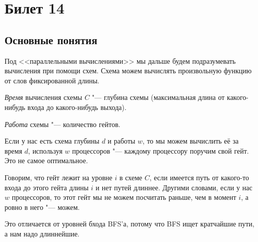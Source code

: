 \setcounter{section}{13}
\section{Билет 14}
\subsection{Основные понятия}
	Под <<параллельными вычислениями>> мы дальше будем подразумевать вычисления при помощи схем.
	Схема можем вычислять произвольную функцию от слов фиксированной длины.

	\begin{Def}
		\textit{Время} вычисления схемы $C$ "--- глубина схемы (максимальная длина от какого-нибудь входа до какого-нибудь выхода).
	\end{Def}
	\begin{Def}
		\textit{Работа} схемы "--- количество гейтов.
	\end{Def}
	\begin{Rem}
		Если у нас есть схема глубины $d$ и работы $w$, то мы можем вычислить её за время $d$, используя $w$ процессоров "--- каждому процессору поручим свой гейт.
		Это не самое оптимальное.
	\end{Rem}

	\begin{Def}
		Говорим, что гейт лежит на уровне $i$ в схеме $C$, если имеется путь от какого-то входа до этого гейта длины $i$ и нет путей длиннее.
		Другими словами, если у нас $w$ процессоров, то этот гейт мы не можем посчитать раньше, чем в момент $i$, а ровно в него "--- можем.
	\end{Def}
	\begin{Rem}
		Это отличается от уровней бхода BFS'а, потому что BFS ищет кратчайшие пути, а нам надо длиннейшие.
	\end{Rem}

